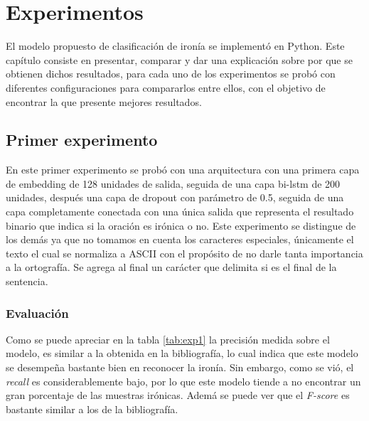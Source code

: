 \chapter{Experimentos}\label{cap.experimentos}


\par El modelo propuesto de clasificación de ironía se implementó en Python. Este capítulo consiste en presentar, comparar y dar una explicación sobre por que se obtienen dichos resultados, para cada uno de los experimentos se probó con diferentes configuraciones para compararlos entre ellos, con el objetivo de encontrar la que presente mejores resultados.

\section{Primer experimento}

\par En este primer experimento se probó con una arquitectura con una primera capa de embedding de 128 unidades de salida, seguida de una capa \gls{bi-lstm} de 200 unidades, después una capa de dropout con parámetro de 0.5, seguida de una capa completamente conectada con una única salida que representa el resultado binario que indica si la oración es irónica o no. Este experimento se distingue de los demás ya que no tomamos en cuenta los caracteres especiales, únicamente el texto el cual se normaliza a ASCII con el propósito de no darle tanta importancia a la ortografía. Se agrega al final un carácter que delimita si es el final de la sentencia.

\subsection{Evaluación}
\begin{center}
	
\end{center}

\par Como se puede apreciar en la tabla \ref{tab:exp1} la precisión medida sobre el modelo, es similar a la obtenida en la bibliografía, lo cual indica que este modelo se desempeña bastante bien en reconocer la ironía. Sin embargo, como se vió, el \textit{recall} es considerablemente bajo, por lo que este modelo tiende a no encontrar un gran porcentaje de las muestras irónicas. Ademá se puede ver que el \textit{F-score} es bastante similar a los de la bibliografía.

\vspace{6pt}

